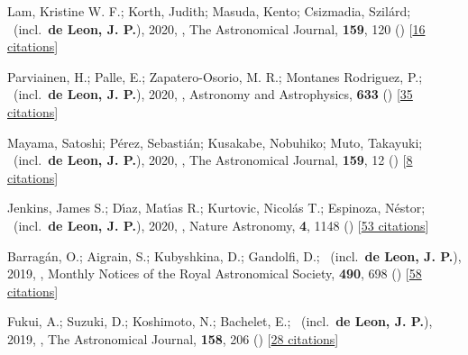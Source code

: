 \item[{\color{numcolor}\scriptsize21}] Lam, Kristine W. F.; Korth, Judith; Masuda, Kento; Csizmadia, Szil{\'a}rd; \etal\ (incl.\ \textbf{de Leon, J. P.}), 2020, , The Astronomical Journal, \textbf{159}, 120 () [\href{https://ui.adsabs.harvard.edu/abs/2020AJ....159..120L}{16 citations}]

\item[{\color{numcolor}\scriptsize20}] Parviainen, H.; Palle, E.; Zapatero-Osorio, M. R.; Montanes Rodriguez, P.; \etal\ (incl.\ \textbf{de Leon, J. P.}), 2020, , Astronomy and Astrophysics, \textbf{633} () [\href{https://ui.adsabs.harvard.edu/abs/2020A&A...633A..28P}{35 citations}]

\item[{\color{numcolor}\scriptsize19}] Mayama, Satoshi; P{\'e}rez, Sebasti{\'a}n; Kusakabe, Nobuhiko; Muto, Takayuki; \etal\ (incl.\ \textbf{de Leon, J. P.}), 2020, , The Astronomical Journal, \textbf{159}, 12 () [\href{https://ui.adsabs.harvard.edu/abs/2020AJ....159...12M}{8 citations}]

\item[{\color{numcolor}\scriptsize18}] Jenkins, James S.; D{\'\i}az, Mat{\'\i}as R.; Kurtovic, Nicol{\'a}s T.; Espinoza, N{\'e}stor; \etal\ (incl.\ \textbf{de Leon, J. P.}), 2020, , Nature Astronomy, \textbf{4}, 1148 () [\href{https://ui.adsabs.harvard.edu/abs/2020NatAs...4.1148J}{53 citations}]

\item[{\color{numcolor}\scriptsize17}] Barrag{\'a}n, O.; Aigrain, S.; Kubyshkina, D.; Gandolfi, D.; \etal\ (incl.\ \textbf{de Leon, J. P.}), 2019, , Monthly Notices of the Royal Astronomical Society, \textbf{490}, 698 () [\href{https://ui.adsabs.harvard.edu/abs/2019MNRAS.490..698B}{58 citations}]

\item[{\color{numcolor}\scriptsize16}] Fukui, A.; Suzuki, D.; Koshimoto, N.; Bachelet, E.; \etal\ (incl.\ \textbf{de Leon, J. P.}), 2019, , The Astronomical Journal, \textbf{158}, 206 () [\href{https://ui.adsabs.harvard.edu/abs/2019AJ....158..206F}{28 citations}]

